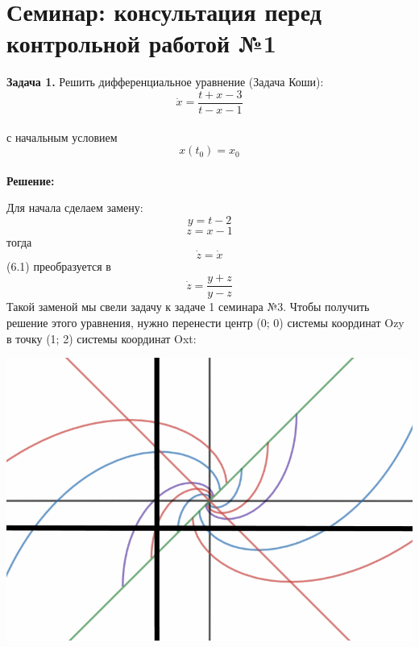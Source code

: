 \documentclass[10pt]{report}
\begin{document}
\chapter[{Семинар: консультация перед контрольной работой №1}]{Семинар: консультация перед контрольной работой №1}
\thispagestyle{empty}
\maketitle
\textbf{Задача 1.} Решить дифференциальное уравнение (Задача Коши): 
\newline
\begin{equation}
\dot {x} = \frac {t+x-3} {t-x-1}
\end{equation}\\
с начальным условием
\begin{equation}
x(t_0) = x_0
\end{equation}\\
\textbf{Решение:} \par
Для начала сделаем замену:\\
\[y=t-2\]
\[z=x-1\]
тогда
\[\dot{z} = \dot {x}\]
(6.1) преобразуется в\\
\[ \dot{z}= \frac {y+z} {y-z}\]
Такой заменой мы свели задачу к задаче 1 семинара №3. Чтобы получить решение этого уравнения, нужно перенести центр (0; 0) системы координат Ozy в точку (1; 2) системы координат Oxt:
\begin{center}
{\includegraphics[scale=0.5]{graph6.1.png}} 
\end{center}
\maketitle
\end{document}
